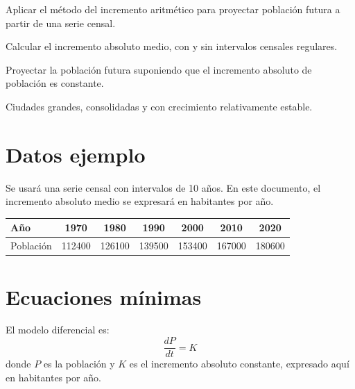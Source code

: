 \documentclass[11pt]{scrartcl}
\begin{document}
\icvmaketitle

\begin{icvobjectives}
  \item Aplicar el método del incremento aritmético para proyectar
    población futura a partir de una serie censal.
  \item Calcular el incremento absoluto medio, con y sin intervalos
    censales regulares.
\end{icvobjectives}

\begin{icvnote}[Propósito]
Proyectar la población futura suponiendo que el incremento absoluto de
población es constante.
\end{icvnote}

\begin{icvnote}
Ciudades grandes, consolidadas y con crecimiento relativamente estable.
\end{icvnote}

\section{Datos ejemplo}

Se usará una serie censal con intervalos de \num{10} años. En este
documento, el incremento absoluto medio se expresará en habitantes por año.

\begin{center}
\begin{tabular}{l S[table-format=6.0] S[table-format=6.0] S[table-format=6.0]
                  S[table-format=6.0] S[table-format=6.0] S[table-format=6.0]}
  \toprule
  Año & {1970} & {1980} & {1990} & {2000} & {2010} & {2020} \\
  \midrule
  Población & 112400 & 126100 & 139500 & 153400 & 167000 & 180600 \\
  \bottomrule
\end{tabular}
\end{center}

\section{Ecuaciones mínimas}

El modelo diferencial es:
\begin{equation}
  \frac{dP}{dt}=K
\end{equation}
donde \(P\) es la población y \(K\) es el incremento absoluto constante,
expresado aquí en habitantes por año.
\end{document}
